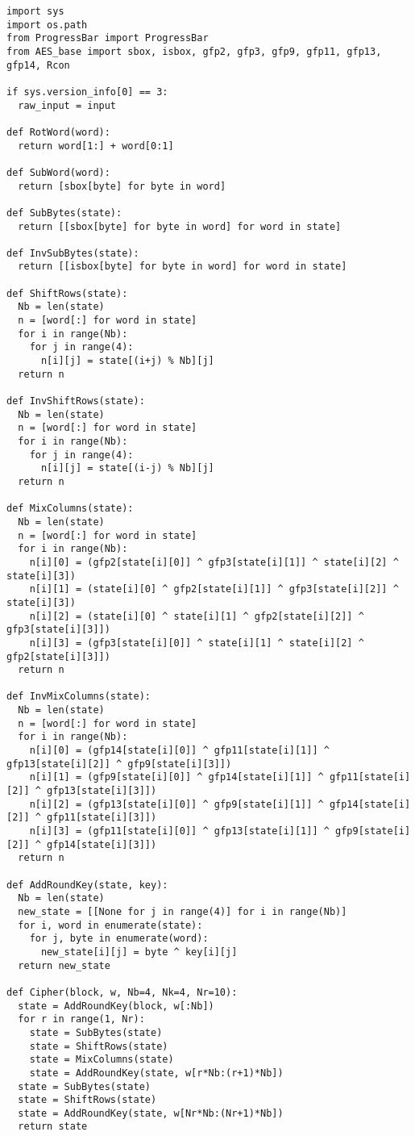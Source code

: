 \begin{verbatim}
import sys
import os.path
from ProgressBar import ProgressBar
from AES_base import sbox, isbox, gfp2, gfp3, gfp9, gfp11, gfp13, gfp14, Rcon

if sys.version_info[0] == 3:
  raw_input = input

def RotWord(word):
  return word[1:] + word[0:1]

def SubWord(word):
  return [sbox[byte] for byte in word]

def SubBytes(state):
  return [[sbox[byte] for byte in word] for word in state]

def InvSubBytes(state):
  return [[isbox[byte] for byte in word] for word in state]

def ShiftRows(state):
  Nb = len(state)
  n = [word[:] for word in state]
  for i in range(Nb):
    for j in range(4):
      n[i][j] = state[(i+j) % Nb][j]
  return n

def InvShiftRows(state):
  Nb = len(state)
  n = [word[:] for word in state]
  for i in range(Nb):
    for j in range(4):
      n[i][j] = state[(i-j) % Nb][j]
  return n

def MixColumns(state):
  Nb = len(state)
  n = [word[:] for word in state]
  for i in range(Nb):
    n[i][0] = (gfp2[state[i][0]] ^ gfp3[state[i][1]] ^ state[i][2] ^ state[i][3])
    n[i][1] = (state[i][0] ^ gfp2[state[i][1]] ^ gfp3[state[i][2]] ^ state[i][3])
    n[i][2] = (state[i][0] ^ state[i][1] ^ gfp2[state[i][2]] ^ gfp3[state[i][3]])
    n[i][3] = (gfp3[state[i][0]] ^ state[i][1] ^ state[i][2] ^ gfp2[state[i][3]])
  return n

def InvMixColumns(state):
  Nb = len(state)
  n = [word[:] for word in state]
  for i in range(Nb):
    n[i][0] = (gfp14[state[i][0]] ^ gfp11[state[i][1]] ^ gfp13[state[i][2]] ^ gfp9[state[i][3]])
    n[i][1] = (gfp9[state[i][0]] ^ gfp14[state[i][1]] ^ gfp11[state[i][2]] ^ gfp13[state[i][3]])
    n[i][2] = (gfp13[state[i][0]] ^ gfp9[state[i][1]] ^ gfp14[state[i][2]] ^ gfp11[state[i][3]])
    n[i][3] = (gfp11[state[i][0]] ^ gfp13[state[i][1]] ^ gfp9[state[i][2]] ^ gfp14[state[i][3]])
  return n

def AddRoundKey(state, key):
  Nb = len(state)
  new_state = [[None for j in range(4)] for i in range(Nb)]
  for i, word in enumerate(state):
    for j, byte in enumerate(word):
      new_state[i][j] = byte ^ key[i][j]
  return new_state

def Cipher(block, w, Nb=4, Nk=4, Nr=10):
  state = AddRoundKey(block, w[:Nb])
  for r in range(1, Nr):
    state = SubBytes(state)
    state = ShiftRows(state)
    state = MixColumns(state)
    state = AddRoundKey(state, w[r*Nb:(r+1)*Nb])
  state = SubBytes(state)
  state = ShiftRows(state)
  state = AddRoundKey(state, w[Nr*Nb:(Nr+1)*Nb])
  return state


\end{verbatim}
